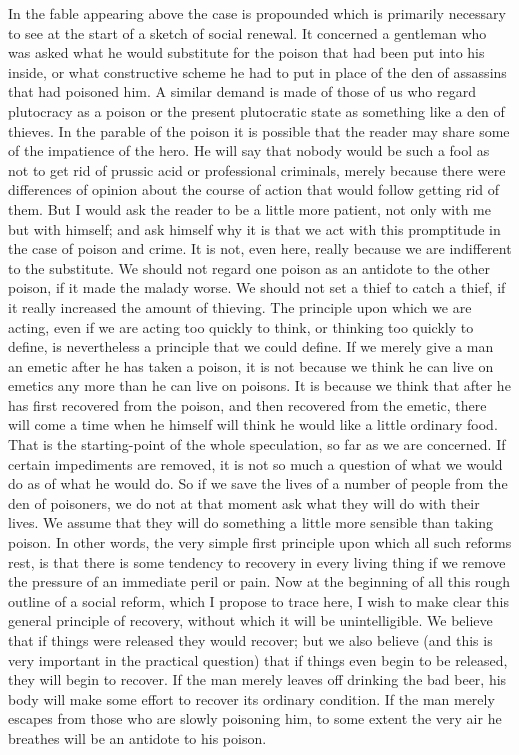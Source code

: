 \documentclass{book}
\begin{document}
In the fable appearing above the case is propounded which is primarily necessary to see at the start of a sketch of social renewal. It concerned a gentleman who was asked what he would substitute for the poison that had been put into his inside, or what constructive scheme he had to put in place of the den of assassins that had poisoned him. A similar demand is made of those of us who regard plutocracy as a poison or the present plutocratic state as something like a den of thieves. In the parable of the poison it is possible that the reader may share some of the impatience of the hero. He will say that nobody would be such a fool as not to get rid of prussic acid or professional criminals, merely because there were differences of opinion about the course of action that would follow getting rid of them. But I would ask the reader to be a little more patient, not only with me but with himself; and ask himself why it is that we act with this promptitude in the case of poison and crime. It is not, even here, really because we are indifferent to the substitute. We should not regard one poison as an antidote to the other poison, if it made the malady worse. We should not set a thief to catch a thief, if it really increased the amount of thieving. The principle upon which we are acting, even if we are acting too quickly to think, or thinking too quickly to define, is nevertheless a principle that we could define. If we merely give a man an emetic after he has taken a poison, it is not because we think he can live on emetics any more than he can live on poisons. It is because we think that after he has first recovered from the poison, and then recovered from the emetic, there will come a time when he himself will think he would like a little ordinary food. That is the starting-point of the whole speculation, so far as we are concerned. If certain impediments are removed, it is not so much a question of what we would do as of what he would do. So if we save the lives of a number of people from the den of poisoners, we do not at that moment ask what they will do with their lives. We assume that they will do something a little more sensible than taking poison. In other words, the very simple first principle upon which all such reforms rest, is that there is some tendency to recovery in every living thing if we remove the pressure of an immediate peril or pain. Now at the beginning of all this rough outline of a social reform, which I propose to trace here, I wish to make clear this general principle of recovery, without which it will be unintelligible. We believe that if things were released they would recover; but we also believe (and this is very important in the practical question) that if things even begin to be released, they will begin to recover. If the man merely leaves off drinking the bad beer, his body will make some effort to recover its ordinary condition. If the man merely escapes from those who are slowly poisoning him, to some extent the very air he breathes will be an antidote to his poison.
\end{document}
